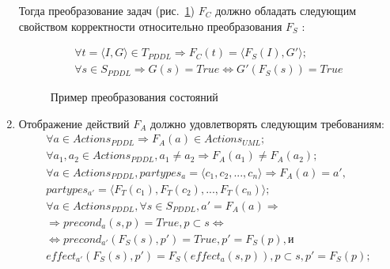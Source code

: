 \begin{enumerate}
        Тогда преобразование задач (рис.~\ref{img:property-tasks}) $F_C$ должно обладать следующим свойством корректности относительно преобразования $F_S$ :
        
        \begin{eqnarray}\label{eq:task}
            \forall t = \langle I, G \rangle \in T_{PDDL} \Rightarrow F_C(t) = \langle F_S(I), G' \rangle; \nonumber\\
            \forall s \in S_{PDDL} \Rightarrow G(s) = True \Leftrightarrow G'(F_S(s)) = True 
        \end{eqnarray}
   
\begin{figure}[h]
    \caption{Пример преобразования состояний}
    \label{img:property-tasks}
\end{figure}   
           
        \item
    Отображение действий $F_A$ должно удовлетворять следующим требованиям:
    \begin{eqnarray}\label{eq:action}
        \forall a \in Actions_{PDDL} \Rightarrow F_A(a) \in Actions_{UML}; \nonumber\\    
        \forall a_1, a_2 \in Actions_{PDDL}, a_1 \neq a_2 \Rightarrow F_A(a_1) \neq F_A(a_2); \nonumber\\        
        \forall a \in Actions_{PDDL}, partypes_a = \langle c_1, c_2, ..., c_n \rangle \Rightarrow F_A(a) = a',\nonumber\\
        partypes_{a'} = \langle F_T(c_1), F_T(c_2), ..., F_T(c_n)\rangle; \nonumber\\
        \forall a \in Actions_{PDDL}, \forall s \in S_{PDDL}, a' = F_A(a) \Rightarrow \nonumber\\ 
        \Rightarrow precond_a(s, p) = True, p \subset s 
        \Leftrightarrow \nonumber\\
        \Leftrightarrow precond_{a'}(F_S(s), p') = True, p' = F_S(p), \text{и}\nonumber\\  
        effect_{a'}(F_S(s), p') = F_S(effect_a(s, p)), p \subset s, p' = F_S(p);
    \end{eqnarray}            
       

\end{enumerate}
